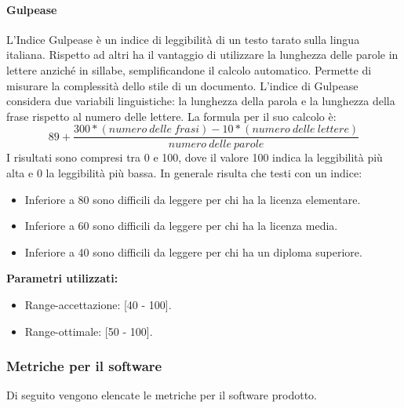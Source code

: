 			\paragraph{Gulpease}
			L'Indice Gulpease è un indice di leggibilità di un testo tarato sulla lingua italiana. Rispetto ad altri ha il vantaggio di utilizzare la lunghezza delle parole in lettere anziché in sillabe, semplificandone il calcolo automatico. Permette di misurare la complessità dello stile di un documento.
			L'indice di Gulpease considera due variabili linguistiche: la lunghezza della parola e la lunghezza della frase rispetto al numero delle lettere.
			La formula per il suo calcolo è: \\
			\[
			89 + \frac{300 * (numero\ delle\ frasi) - 10 * (numero\ delle\ lettere)}{numero\ delle\ parole}
			\]
			I risultati sono compresi tra 0 e 100, dove il valore 100 indica la leggibilità più alta e 0 la leggibilità più bassa. In generale risulta che testi con un indice:
			\begin{itemize}
				\item Inferiore a 80 sono difficili da leggere per chi ha la licenza elementare.
				\item Inferiore a 60 sono difficili da leggere per chi ha la licenza media.
				\item Inferiore a 40 sono difficili da leggere per chi ha un diploma superiore.
			\end{itemize}
			\textbf{Parametri utilizzati:}
			\begin{itemize}
				\item Range-accettazione: [40 - 100].
				\item Range-ottimale: [50 - 100].
			\end{itemize}
			
		\subsubsection{Metriche per il software}
		Di seguito vengono elencate le metriche per il software prodotto.		
		
